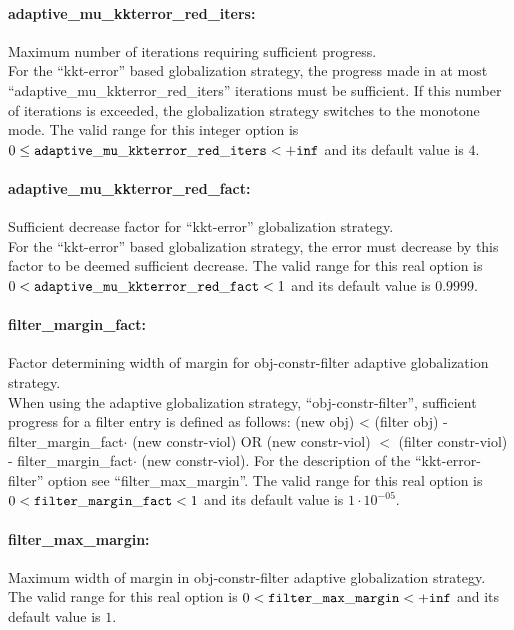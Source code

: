 \paragraph{adaptive\_mu\_kkterror\_red\_iters:} Maximum number of iterations requiring sufficient progress. $\;$ \\
 For the ``kkt-error'' based globalization strategy,
the progress made in at most ``adaptive\_mu\_kkterror\_red\_iters'' iterations must be sufficient.
If this number of iterations is exceeded, the
globalization strategy switches to the monotone
mode. The valid range for this integer option is
$0 \le {\tt adaptive\_mu\_kkterror\_red\_iters } <  {\tt +inf}$
and its default value is $4$.


\paragraph{adaptive\_mu\_kkterror\_red\_fact:} Sufficient decrease factor for ``kkt-error'' globalization strategy. $\;$ \\
 For the ``kkt-error'' based globalization strategy,
the error must decrease by this factor to be
deemed sufficient decrease. The valid range for this real option is 
$0 <  {\tt adaptive\_mu\_kkterror\_red\_fact } <  1$
and its default value is $0.9999$.


\paragraph{filter\_margin\_fact:} Factor determining width of margin for obj-constr-filter adaptive globalization strategy. $\;$ \\
 When using the adaptive globalization strategy,
``obj-constr-filter'', sufficient progress for a
filter entry is defined as follows: (new obj) <
(filter obj) - filter\_margin\_fact$\cdot$ (new
constr-viol) OR (new constr-viol) $<$ (filter
constr-viol) - filter\_margin\_fact$\cdot$ (new
constr-viol).  For the description of the
``kkt-error-filter'' option see
``filter\_max\_margin''. The valid range for this real option is 
$0 <  {\tt filter\_margin\_fact } <  1$
and its default value is $1 \cdot 10^{-05}$.


\paragraph{filter\_max\_margin:} Maximum width of margin in obj-constr-filter adaptive globalization strategy. $\;$ \\
 The valid range for this real option is 
$0 <  {\tt filter\_max\_margin } <  {\tt +inf}$
and its default value is $1$.


